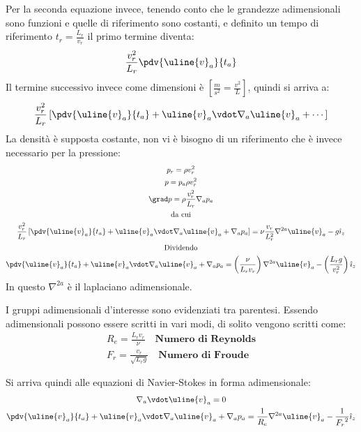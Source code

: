 Per la seconda equazione invece, tenendo conto che le grandezze adimensionali sono funzioni e quelle di riferimento sono costanti, e definito un tempo di riferimento $t_r = \frac{L_r}{v_r}$ il primo termine diventa:
%
	\begin{equation*}
		\frac{v^2_r}{L_r} \pdv{\uline{v}_a}{t_a}\\
	\end{equation*}
%
Il termine successivo invece come dimensioni è $\left[ \frac{m}{s^2} = \frac{v^2}{L} \right]$, quindi si arriva a:
%
	\begin{equation*}
		\frac{v^2_r}{L_r} \left[ \pdv{\uline{v}_a}{t_a} + \uline{v}_a \vdot \nabla_a \uline{v}_a + \cdots \right]
	\end{equation*}
%
La densità è supposta costante, non vi è bisogno di un riferimento che è invece necessario per la pressione:
%
	\begin{equation*}
		\begin{gathered}
			p_r = \rho v_r^2\\
			p = p_a \rho v^2_r\\
			\grad p = \rho \frac{v^2_r}{L_r} \nabla_a p_a\\		
			\text{da cui}\\
 			\frac{v^2_r}{L_r} \left[ \pdv{{\uline{v}}_a}{t_a} + \uline{v}_a \vdot \nabla_a \uline{v}_a + \nabla_a p_a \right] = \nu \frac{v_r}{L^2_r} \nabla^{2a} \uline{v}_a - g {\hat{\imath}}_z\\
 			\text{Dividendo}\\
 			\pdv{{\uline{v}}_a}{t_a} + \uline{v}_a \vdot \nabla_a \uline{v}_a + \nabla_a p_a =  \left( \frac{\nu}{L_r v_r} \right) \nabla^{2a} \uline{v}_a - \left( \frac{L_r g}{v^2_r} \right) {\hat{\imath}}_z
		\end{gathered}
	\end{equation*}
%
In questo $\nabla^{2a}$ è il laplaciano adimensionale.

I gruppi adimensionali d'interesse sono evidenziati tra parentesi. 
Essendo adimensionali possono essere scritti in vari modi, di solito vengono scritti come:
%
	\begin{equation*}
		\begin{gathered}
			R_e = \frac{L_r v_r}{\nu} \quad \textbf{Numero di Reynolds}\\
			F_r = \frac{v_r}{ \sqrt{L_r g} } \quad \textbf{Numero di Froude}
		\end{gathered}
	\end{equation*}
%

Si arriva quindi alle equazioni di Navier-Stokes in forma adimensionale:
%
	\begin{equation*}
		\begin{gathered}
			\nabla_a \vdot \uline{v}_a = 0\\
			\pdv{\uline{v}_a}{t_a} + \uline{v}_a \vdot \nabla_a \uline{v}_a + \nabla_a p_a = \frac{1}{R_e} \nabla^{2a} \uline{v}_a - \frac{1}{{F_r}^2} {\hat{\imath}}_z
		\end{gathered}
	\end{equation*}
%

